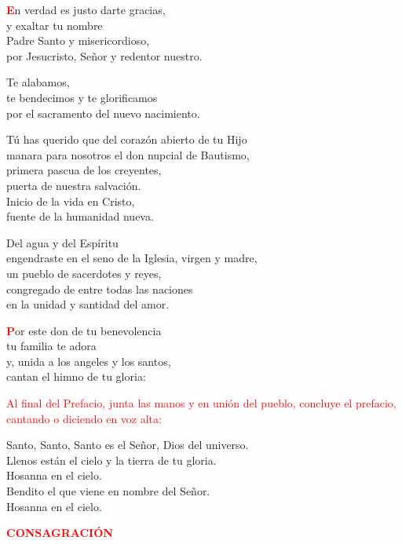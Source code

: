 \documentclass[12pt, letterpaper]{report}
\begin{document}
\lettrine[lines=1]{\bfseries \textcolor{red}{E}}{}\Large n verdad es justo darte gracias, \\ 
y exaltar tu nombre \\ 
Padre Santo y misericordioso, \\
por Jesucristo, Se\~nor y redentor nuestro.

\noindent
Te alabamos, \\
te bendecimos y te glorificamos \\
por el sacramento del nuevo nacimiento.

\noindent
T\'u has querido que del coraz\'on abierto de tu Hijo \\
manara para nosotros el don nupcial de Bautismo, \\
primera pascua de los creyentes, \\
puerta de nuestra salvaci\'on. \\
Inicio de la vida en Cristo, \\
fuente de la humanidad nueva.

\newpage

\noindent
Del agua y del Esp\'iritu \\
engendraste en el seno de la Iglesia, virgen y madre, \\
un pueblo de sacerdotes y reyes, \\
congregado de entre todas las naciones \\
en la unidad y santidad del amor.

\lettrine[lines=1]{\bfseries \textcolor{red}{P}}{}\Large or este don de tu benevolencia \\
tu familia te adora \\
y, unida a los angeles y los santos, \\
cantan el himno de tu gloria:

\large{\textcolor{red}{Al final del Prefacio, junta las manos y en uni\'on del pueblo, concluye el prefacio, cantando o diciendo en voz alta:}}

\noindent
\Large {Santo, Santo, Santo es el Se\~nor, Dios del universo.\\
Llenos est\'an el cielo y la tierra de tu gloria.\\
Hosanna en el cielo.\\
Bendito el que viene en nombre del Se\~nor.\\
Hosanna en el cielo.}

\newpage

\Large {\bfseries \textcolor{red}{CONSAGRACI\'ON}} 
\end{document}
